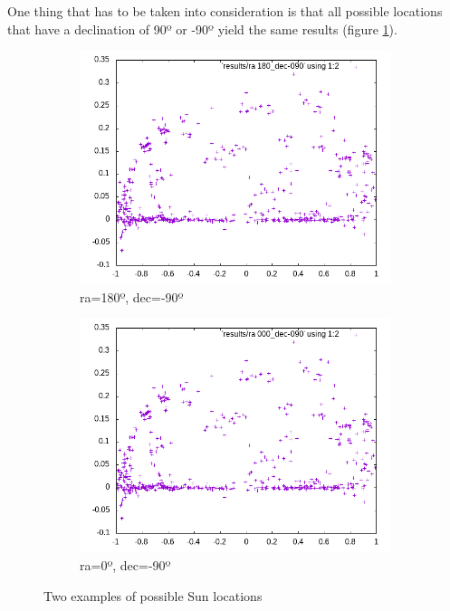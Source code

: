 \clearpage

One thing that has to be taken into consideration is that all possible locations that have a declination of 90º or -90º yield the same results (figure \ref{fig:poles}).

\begin{figure}[!htb]
	\begin{subfigure}[b]{0.5\textwidth}
		\includegraphics[width=\linewidth]{images/ch4/ra180_dec-090.png}
		\caption{ra=180º, dec=-90º}
	\end{subfigure}
	\hfill
	\begin{subfigure}[b]{0.5\textwidth}
		\includegraphics[width=\linewidth]{images/ch4/ra000_dec-090.png}
		\caption{ra=0º, dec=-90º}
	\end{subfigure}
	\caption{Two examples of possible Sun locations}
	\label{fig:poles}
\end{figure}

